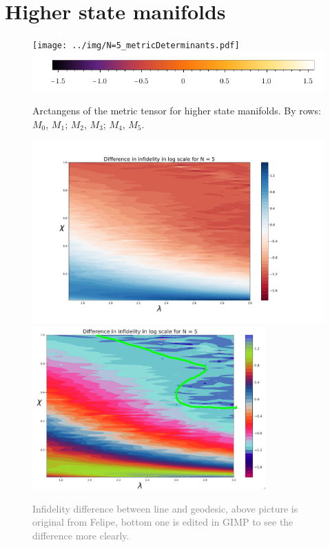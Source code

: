 \section{Higher state manifolds}



\begin{figure}[H]
    \centering
    \texttt{[image: ../img/N=5\_metricDeterminants.pdf]}
    \includegraphics[scale=1.2]{../img/N=3_barA.pdf}
    \caption{Arctangens of the metric tensor for higher state manifolds. By  rows: $M_0$, $M_1$; $M_2$, $M_3$; $M_4$, $M_5$.}
    \label{fig:higherStateManifolds}    
\end{figure}


\begin{figure}[H]
    \centering
    \includegraphics[width=1\textwidth]{../img/fidelity_lineVSgeodesic.pdf}
    \includegraphics[width=0.8\textwidth]{../img/fidelity_geodesicVSline_fuckedupcolors.png}
    \caption{\textcolor{gray}{Infidelity difference between line and geodesic, above picture is original from Felipe, bottom one is edited in GIMP to see the difference more clearly.}}
    \label{fig:higherStateManifolds}    
\end{figure}
